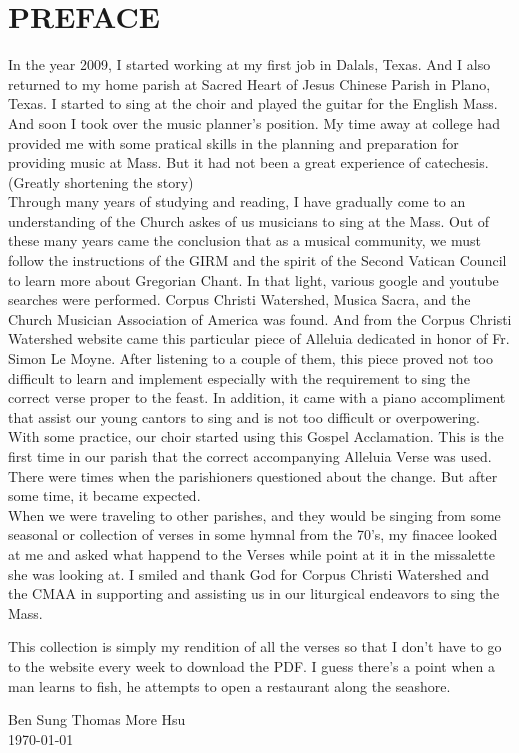 \documentclass[11pt,oneside]{book} %
\begin{document}
\chapter{PREFACE}
\begin{paragraph}
In the year 2009, I started working at my first job in Dalals, Texas. 
And I also returned to my home parish at Sacred Heart of Jesus Chinese
Parish in Plano, Texas. I started to sing at the choir and played the guitar
for the English Mass. And soon I took over the music planner's position.
My time away at college had provided me with some pratical skills in the planning
and preparation for providing music at Mass. But it had not been a great experience
of catechesis. \\

(Greatly shortening the story) \\

Through many years of studying and reading, I have gradually come
to an understanding of the Church askes of us musicians to sing at the Mass.
Out of these many years came the conclusion that as a musical community, we must
follow the instructions of the GIRM and the spirit of the Second Vatican Council
 to learn more about Gregorian Chant. In that light, various google and 
youtube searches were performed. Corpus Christi Watershed, Musica Sacra, and 
the Church Musician Association of America was found. And from the Corpus Christi
Watershed website came this particular piece of Alleluia dedicated in honor of
Fr. Simon Le Moyne. After listening to a couple of them, this piece proved not
too difficult to learn and implement especially with the requirement to sing
the correct verse proper to the feast. In addition, it came with a piano
 accompliment that assist our young cantors to sing and is not too
 difficult or overpowering. With some practice, our choir started using
this Gospel Acclamation. This is the first time in our parish that the
correct accompanying Alleluia Verse was used. There were times when the parishioners
questioned about the change. But after some time, it became expected.\\

When we were traveling to other parishes, and they would be singing from some
seasonal or collection of verses in some hymnal from the 70's, my finacee looked at
me and asked what happend to the Verses while point at it in the missalette she
was looking at. I smiled and thank God for Corpus Christi Watershed and the CMAA
in supporting and assisting us in our liturgical endeavors to sing the Mass.

This collection is simply my rendition of all the verses so that I don't have to
go to the website every week to download the PDF. I guess there's a point when 
a man learns to fish, he attempts to open a restaurant along the seashore.

\begin{center}Ben Sung Thomas More Hsu\\\today
\end{center}

\end{paragraph}
\end{document}

